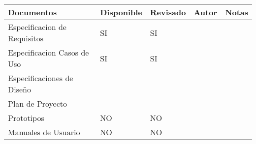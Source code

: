 \begin{center}
   \begin{tabular}{|p{3cm}|p{2.2cm}|p{1.8cm}|p{2cm}|p{3cm}|}
     \hline
     \textbf{Documentos} & \textbf{Disponible} & \textbf{Revisado} & \textbf{Autor} & \textbf{Notas} \\ \hline
     Especificacion de Requisitos & SI & SI &  &  \\ \hline
     Especificacion Casos de Uso & SI & SI &  &  \\ \hline
     Especificaciones de Diseño &  &  & & \\ \hline
     Plan de \newline Proyecto &  &  & & \\ \hline
     Prototipos & NO & NO & & \\ \hline
     Manuales de \newline Usuario & NO & NO & & \\ \hline
   \end{tabular}
\end{center}
	
	
	
	
	
	
	
	
	
	
	
	
	